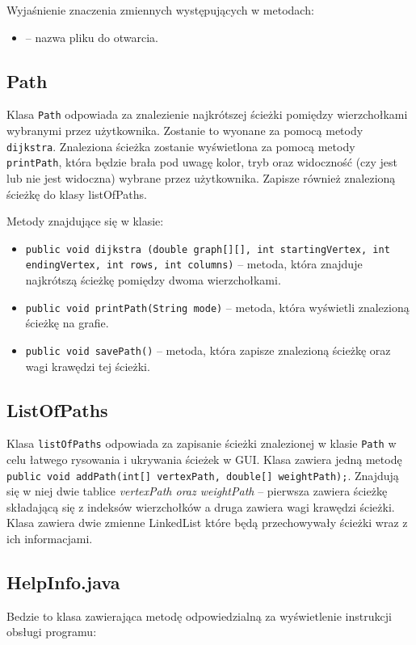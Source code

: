 \documentclass[12pt, a4paper]{article}
\begin{document}
Wyjaśnienie znaczenia zmiennych występujących w metodach:
\begin{itemize}
    \item {} -- nazwa pliku do otwarcia.
\end{itemize}

\subsection{Path}
Klasa \texttt{Path} odpowiada za znalezienie najkrótszej ścieżki pomiędzy wierzchołkami wybranymi przez użytkownika. Zostanie to wyonane za pomocą metody \texttt{dijkstra}. Znaleziona ścieżka zostanie wyświetlona za pomocą metody \texttt{printPath}, która będzie brała pod uwagę kolor, tryb oraz widoczność (czy jest lub nie jest widoczna) wybrane przez użytkownika. Zapisze również znalezioną ścieżkę do klasy listOfPaths.

Metody znajdujące się w klasie:
\begin{itemize}
    \item \texttt{public void dijkstra (double graph[][], int startingVertex, int endingVertex, int rows, int columns)} -- metoda, która znajduje najkrótszą ścieżkę pomiędzy dwoma wierzchołkami.
    \item \texttt{public void printPath(String mode)} -- metoda, która wyświetli znalezioną ścieżkę na grafie.
    \item \texttt{public void savePath()} -- metoda, która zapisze znalezioną ścieżkę oraz wagi krawędzi tej ścieżki.
\end{itemize}


\subsection{ListOfPaths}
Klasa \texttt{listOfPaths} odpowiada za zapisanie ścieżki znalezionej w klasie \texttt{Path} w celu łatwego rysowania i ukrywania ścieżek w GUI. Klasa zawiera jedną metodę \texttt{public void addPath(int[] vertexPath, double[] weightPath);}. Znajdują się w niej dwie tablice \textit{vertexPath oraz weightPath} -- pierwsza zawiera ścieżkę składającą się z indeksów wierzchołków a druga zawiera wagi krawędzi ścieżki. Klasa zawiera dwie zmienne LinkedList które będą przechowywały ścieżki wraz z ich informacjami.



\subsection{HelpInfo.java}
Bedzie to klasa zawierająca metodę odpowiedzialną za wyświetlenie instrukcji obsługi programu:
\end{document}
